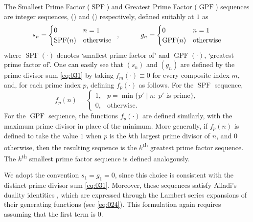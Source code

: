 \documentclass{article}
\numberwithin{equation}{section}
\theoremstyle{definition}
\begin{document}
The Smallest Prime Factor ($\operatorname{SPF}$) and Greatest Prime Factor ($\operatorname{GPF}$) sequences are integer sequences, (\cite[\textit{OEIS A020639}]{oeis}) and (\cite[\textit{OEIS A006530}]{oeis}) respectively, defined suitably at $1$ as
\[s_n=\begin{cases}
        0 & n=1\\
        \operatorname{SPF}(n) & \text{otherwise}
    \end{cases}
\hspace{2mm}\text{, } \hspace{10mm}g_n=\begin{cases}
        0 & n=1\\
        \operatorname{GPF}(n) & \text{otherwise}
    \end{cases}\]
where $\operatorname{SPF}(\cdot)$ denotes `smallest prime factor of' and $\operatorname{GPF}(\cdot)$, `greatest prime factor of'. One can easily see that $(s_n)$ and $(g_n)$ are defined by the prime divisor sum \eqref{eq:031} by taking $f_m(\cdot)\equiv0$ for every composite index $m$, and, for each prime index $p$, defining $f_p(\cdot)$ as follows. For the $\operatorname{SPF}$ sequence,
\[f_p(n)=
\begin{cases}
1,& p=\min\{p'\mid n:\ p'\text{ is prime}\},\\
0,& \text{otherwise}.\end{cases}\]
For the $\operatorname{GPF}$ sequence, the functions $f_p(\cdot)$ are defined similarly, with the maximum prime divisor in place of the minimum. More generally, if $f_p(n)$ is defined to take the value $1$ when $p$ is the $k$th largest prime divisor of $n$, and $0$ otherwise, then the resulting sequence is the $k$\textsuperscript{th} greatest prime factor sequence. The $k$\textsuperscript{th} smallest prime factor sequence is defined analogously.

We adopt the convention \( s_{1} = g_{1} = 0 \), since this choice is consistent with the distinct prime divisor sum \eqref{eq:031}. Moreover, these sequences satisfy Alladi’s duality identities \cite[Lemma~1]{gpfspf0}, which are expressed through the Lambert series expansions of their generating functions (see \eqref{eq:024}). This formulation again requires assuming that the first term is \(0\).
\end{document}
